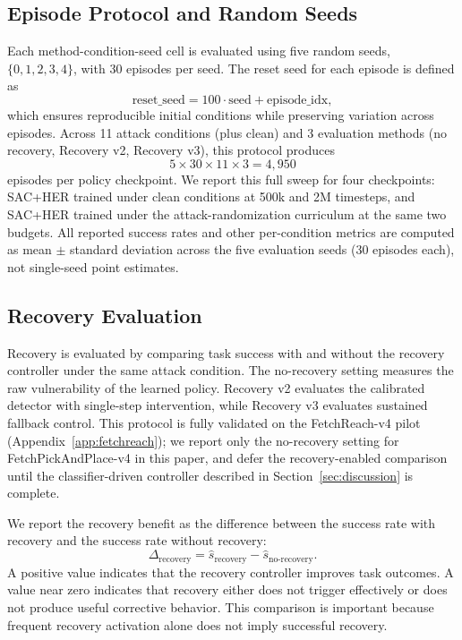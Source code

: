 \documentclass[conference]{IEEEtran}
\begin{document}
\subsection{Episode Protocol and Random Seeds}

Each method-condition-seed cell is evaluated using five random seeds,
$\{0,1,2,3,4\}$, with 30 episodes per seed. The reset seed for each episode is defined
as
\[
\text{reset\_seed} = 100 \cdot \text{seed} + \text{episode\_idx},
\]
which ensures reproducible initial conditions while preserving variation across
episodes. Across 11 attack conditions (plus clean) and 3 evaluation methods
(no recovery, Recovery v2, Recovery v3), this protocol produces
\[
5 \times 30 \times 11 \times 3 = 4{,}950
\]
episodes per policy checkpoint. We report this full sweep for four checkpoints:
SAC+HER trained under clean conditions at 500k and 2M timesteps, and SAC+HER trained
under the attack-randomization curriculum at the same two budgets. All reported
success rates and other per-condition metrics are computed as mean $\pm$ standard
deviation across the five evaluation seeds (30 episodes each), not single-seed point
estimates.

\subsection{Recovery Evaluation}

Recovery is evaluated by comparing task success with and without the recovery
controller under the same attack condition. The no-recovery setting measures the raw
vulnerability of the learned policy. Recovery v2 evaluates the calibrated detector with
single-step intervention, while Recovery v3 evaluates sustained fallback control. This
protocol is fully validated on the FetchReach-v4 pilot (Appendix~\ref{app:fetchreach});
we report only the no-recovery setting for FetchPickAndPlace-v4 in this paper, and
defer the recovery-enabled comparison until the classifier-driven controller described
in Section~\ref{sec:discussion} is complete.

We report the recovery benefit as the difference between the success rate with recovery
and the success rate without recovery:
\[
\Delta_{\mathrm{recovery}} =
\hat{s}_{\mathrm{recovery}} -
\hat{s}_{\mathrm{no\mbox{-}recovery}}.
\]
A positive value indicates that the recovery controller improves task outcomes. A value
near zero indicates that recovery either does not trigger effectively or does not
produce useful corrective behavior. This comparison is important because frequent
recovery activation alone does not imply successful recovery.
\end{document}
